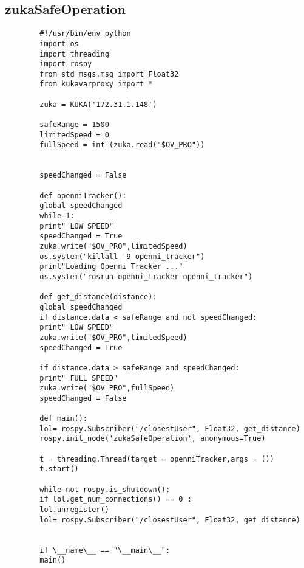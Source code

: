 \documentclass{book}
\begin{document}
	\subsection{zukaSafeOperation}
	\begin{verbatim}
		#!/usr/bin/env python
		import os
		import threading
		import rospy
		from std_msgs.msg import Float32
		from kukavarproxy import *
		
		zuka = KUKA('172.31.1.148')
		
		safeRange = 1500
		limitedSpeed = 0
		fullSpeed = int (zuka.read("$OV_PRO"))
		
		
		speedChanged = False
		
		def openniTracker():
		global speedChanged
		while 1:
		print" LOW SPEED"
		speedChanged = True
		zuka.write("$OV_PRO",limitedSpeed)
		os.system("killall -9 openni_tracker")
		print"Loading Openni Tracker ..."
		os.system("rosrun openni_tracker openni_tracker")
		
		def get_distance(distance):
		global speedChanged
		if distance.data < safeRange and not speedChanged:
		print" LOW SPEED"
		zuka.write("$OV_PRO",limitedSpeed)
		speedChanged = True
		
		if distance.data > safeRange and speedChanged:
		print" FULL SPEED"
		zuka.write("$OV_PRO",fullSpeed)
		speedChanged = False
		
		def main():	
		lol= rospy.Subscriber("/closestUser", Float32, get_distance)
		rospy.init_node('zukaSafeOperation', anonymous=True)
		
		t = threading.Thread(target = openniTracker,args = ())
		t.start()
		
		while not rospy.is_shutdown():
		if lol.get_num_connections() == 0 : 
		lol.unregister()
		lol= rospy.Subscriber("/closestUser", Float32, get_distance)
		
		
		if \__name\__ == "\__main\__":
		main()
	\end{verbatim}
\end{document}
